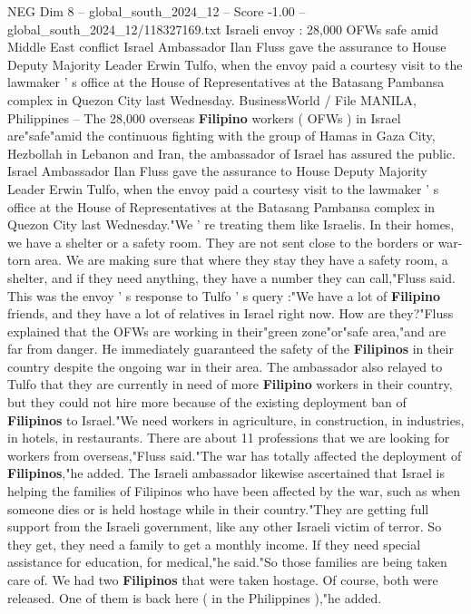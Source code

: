\begin{textsample}{NEG Dim 8 – global\_south\_2024\_12 – Score -1.00 – global\_south\_2024\_12/118327169.txt}  \label{ex:f8_neg_382}
Israeli envoy : 28,000 OFWs safe amid Middle East conflict Israel Ambassador Ilan Fluss gave the assurance to House Deputy Majority Leader Erwin Tulfo, when the envoy paid a courtesy visit to the lawmaker ' s office at the House of Representatives at the Batasang Pambansa complex in Quezon City last Wednesday.
BusinessWorld / File MANILA, Philippines -- The 28,000 overseas \textbf{Filipino} workers ( OFWs ) in Israel are"safe"amid the continuous fighting with the group of Hamas in Gaza City, Hezbollah in Lebanon and Iran, the ambassador of Israel has assured the public.
Israel Ambassador Ilan Fluss gave the assurance to House Deputy Majority Leader Erwin Tulfo, when the envoy paid a courtesy visit to the lawmaker ' s office at the House of Representatives at the Batasang Pambansa complex in Quezon City last Wednesday."We ' re treating them like Israelis.
In their homes, we have a shelter or a safety room.
They are not sent close to the borders or war-torn area.
We are making sure that where they stay they have a safety room, a shelter, and if they need anything, they have a number they can call,"Fluss said.
This was the envoy ' s response to Tulfo ' s query :"We have a lot of \textbf{Filipino} friends, and they have a lot of relatives in Israel right now.
How are they?"Fluss explained that the OFWs are working in their"green zone"or"safe area,"and are far from danger.
He immediately guaranteed the safety of the \textbf{Filipinos} in their country despite the ongoing war in their area.
The ambassador also relayed to Tulfo that they are currently in need of more \textbf{Filipino} workers in their country, but they could not hire more because of the existing deployment ban of \textbf{Filipinos} to Israel."We need workers in agriculture, in construction, in industries, in hotels, in restaurants.
There are about 11 professions that we are looking for workers from overseas,"Fluss said."The war has totally affected the deployment of \textbf{Filipinos},"he added.
The Israeli ambassador likewise ascertained that Israel is helping the families of Filipinos who have been affected by the war, such as when someone dies or is held hostage while in their country."They are getting full support from the Israeli government, like any other Israeli victim of terror.
So they get, they need a family to get a monthly income.
If they need special assistance for education, for medical,"he said."So those families are being taken care of.
We had two \textbf{Filipinos} that were taken hostage.
Of course, both were released.
One of them is back here ( in the Philippines ),"he added.

\end{textsample}
